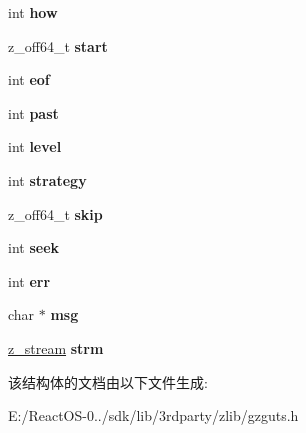 \begin{DoxyCompactItemize}
int {\bfseries how}
\item 
\mbox{\label{structgz__state_a0eb95c1935a32c508a1e6fc1e84c8f83}} 
z\+\_\+off64\+\_\+t {\bfseries start}
\item 
\mbox{\label{structgz__state_ae50ffc823858bc4f909e3d9507356f92}} 
int {\bfseries eof}
\item 
\mbox{\label{structgz__state_a65b39b950d5cabf4c174924c922aa3ff}} 
int {\bfseries past}
\item 
\mbox{\label{structgz__state_aaf5e13a32b8618cde112e4312d480137}} 
int {\bfseries level}
\item 
\mbox{\label{structgz__state_a2777c46311012def486c2aa720fe5203}} 
int {\bfseries strategy}
\item 
\mbox{\label{structgz__state_a4bc336eac6a48fd0f2645e672e5c6c13}} 
z\+\_\+off64\+\_\+t {\bfseries skip}
\item 
\mbox{\label{structgz__state_ab60b82012b8193c3f44b2e48974b9dd9}} 
int {\bfseries seek}
\item 
\mbox{\label{structgz__state_aa9832eb9300c065f6572e5699ab27938}} 
int {\bfseries err}
\item 
\mbox{\label{structgz__state_ad49f321739e10ff0387a0e7fe31c6538}} 
char $\ast$ {\bfseries msg}
\item 
\mbox{\label{structgz__state_a77df647f4deba86cc8a4fa0a01a08f4e}} 
\hyperlink{structz__stream__s}{z\+\_\+stream} {\bfseries strm}
\end{DoxyCompactItemize}


该结构体的文档由以下文件生成\+:\begin{DoxyCompactItemize}
\item 
E\+:/\+React\+O\+S-\/0../sdk/lib/3rdparty/zlib/gzguts.\+h\end{DoxyCompactItemize}
